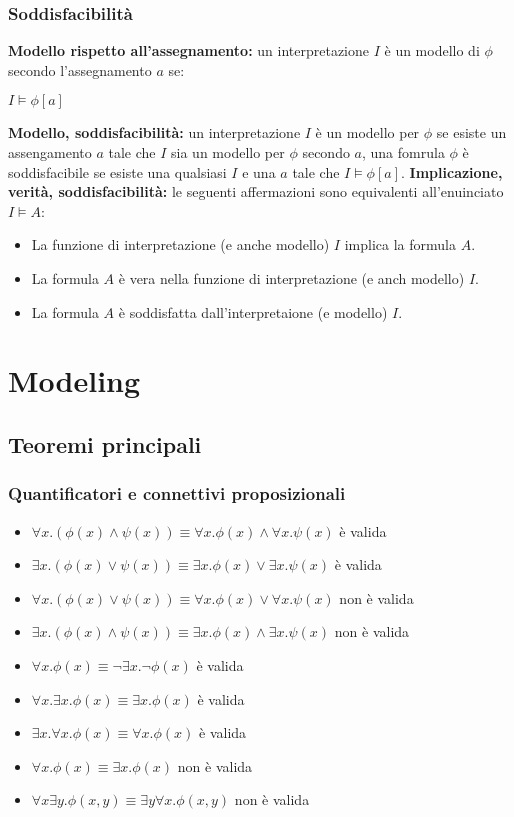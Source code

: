 \documentclass[../main.tex]{subfiles}
\newcommand{\spazio}{\vspace{1em} \newline}
\begin{document}
   \subsection{Soddisfacibilità}
   \textbf{Modello rispetto all'assegnamento:} un interpretazione $I$ è un modello di $\phi$ secondo l'assegnamento $a$ se:
   \begin{center}
      $I \models \phi [a]$
   \end{center}
   \textbf{Modello, soddisfacibilità:} un interpretazione $I$ è un modello per $\phi$ se esiste un assengamento $a$ tale che $I$ sia un modello per $\phi$ secondo $a$, una fomrula $\phi$ è soddisfacibile se esiste una qualsiasi $I$ e una $a$ tale che $I \models \phi [a]$.
   \spazio
   \textbf{Implicazione, verità, soddisfacibilità:} le seguenti affermazioni sono equivalenti all'enuinciato $I \models A$:
   \begin{itemize}
      \item La funzione di interpretazione (e anche modello) $I$ implica la formula $A$.
      \item La formula $A$ è vera nella funzione di interpretazione (e anch modello) $I$.
      \item La formula $A$ è soddisfatta dall'interpretaione (e modello) $I$.
   \end{itemize}

   \chapter{Modeling}
   \section{Teoremi principali}
   \subsection{Quantificatori e connettivi proposizionali}
   \begin{itemize}
      \item $\forall x.(\phi (x) \land \psi (x)) \equiv \forall x .\phi (x) \land \forall x. \psi (x)$ è valida
      \item $\exists x.(\phi (x) \lor \psi (x)) \equiv \exists x. \phi (x) \lor \exists x. \psi (x)$ è valida
      \item $\forall x.(\phi (x) \lor \psi (x)) \equiv \forall x. \phi (x) \lor \forall x. \psi (x)$ non è valida 
      \item $\exists x.(\phi (x) \land \psi (x)) \equiv \exists x.\phi (x) \land \exists x. \psi (x)$ non è valida
      \item $\forall x.\phi(x) \equiv \lnot \exists x.\lnot \phi(x)$ è valida
      \item $\forall x.\exists x.\phi(x) \equiv \exists x.\phi(x)$ è valida
      \item $\exists x.\forall x.\phi(x) \equiv \forall x.\phi(x)$ è valida
      \item $\forall x.\phi(x) \equiv \exists x.\phi(x)$ non è valida 
      \item $\forall x\exists y.\phi(x, y) \equiv \exists y\forall x.\phi(x, y)$ non è valida 
   \end{itemize}
\end{document}
